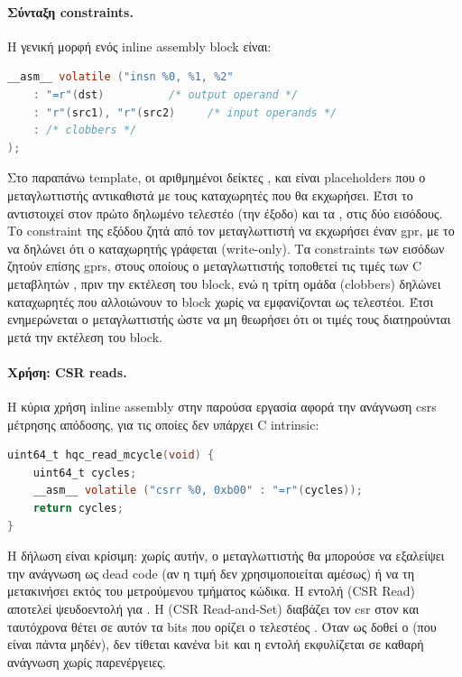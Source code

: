 \paragraph{Σύνταξη constraints.}
Η γενική μορφή ενός inline assembly block είναι:
\begin{lstlisting}[language=C, numbers=none]
__asm__ volatile ("insn %0, %1, %2"
    : "=r"(dst)          /* output operand */
    : "r"(src1), "r"(src2)     /* input operands */
    : /* clobbers */
);
\end{lstlisting}
Στο παραπάνω template, οι αριθμημένοι δείκτες ,  και
 είναι placeholders που ο μεταγλωττιστής αντικαθιστά με τους
καταχωρητές που θα εκχωρήσει. Έτσι το  αντιστοιχεί
στον πρώτο δηλωμένο τελεστέο (την έξοδο) και τα ,  στις
δύο εισόδους. Το
constraint  της εξόδου ζητά από τον μεταγλωττιστή να εκχωρήσει
έναν \gls{gpr}, με το \code{=} να δηλώνει ότι ο καταχωρητής γράφεται
(write-only). Τα constraints  των εισόδων ζητούν επίσης
\glspl{gpr}, στους οποίους ο μεταγλωττιστής τοποθετεί τις τιμές των C
μεταβλητών ,  πριν την εκτέλεση του block, ενώ η
τρίτη ομάδα (clobbers) δηλώνει καταχωρητές που αλλοιώνουν το
block χωρίς να εμφανίζονται ως τελεστέοι. Έτσι ενημερώνεται ο μεταγλωττιστής  
ώστε να μη θεωρήσει ότι οι τιμές τους διατηρούνται μετά την εκτέλεση του block.

\paragraph{Χρήση: CSR reads.}
Η κύρια χρήση inline assembly στην παρούσα εργασία αφορά την ανάγνωση
\glspl{csr} μέτρησης απόδοσης, για τις οποίες δεν υπάρχει C intrinsic:

\begin{lstlisting}[language=C,
  caption={Ανάγνωση \code{mcycle} (CSR 0xb00) μέσω inline assembly.},
  label={lst:csr-read}]
uint64_t hqc_read_mcycle(void) {
    uint64_t cycles;
    __asm__ volatile ("csrr %0, 0xb00" : "=r"(cycles));
    return cycles;
}
\end{lstlisting}

Η δήλωση  είναι κρίσιμη: χωρίς αυτήν, ο μεταγλωττιστής θα
μπορούσε να εξαλείψει την ανάγνωση ως dead code (αν η τιμή δεν
χρησιμοποιείται αμέσως) ή να τη μετακινήσει εκτός του μετρούμενου
τμήματος κώδικα. Η εντολή  (CSR Read) αποτελεί ψευδοεντολή για
. Η  (CSR Read-and-Set) διαβάζει τον
\gls{csr} στον  και ταυτόχρονα θέτει σε αυτόν τα bits που ορίζει ο
τελεστέος . Όταν ως  δοθεί ο  (που είναι πάντα
μηδέν), δεν τίθεται κανένα bit και η εντολή εκφυλίζεται σε καθαρή ανάγνωση
χωρίς παρενέργειες.

